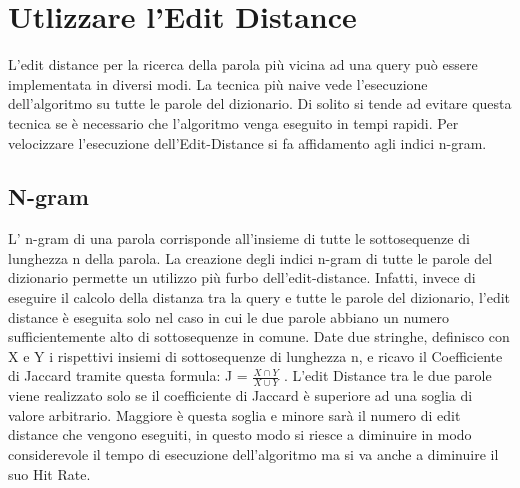 \documentclass{article}
\begin{document}
\section{Utlizzare l'Edit Distance}
L'edit distance per la ricerca della parola più vicina ad una query può essere implementata in diversi modi. La tecnica più naive vede l'esecuzione dell'algoritmo su tutte le parole del dizionario. Di solito si tende ad evitare questa tecnica se è necessario che l'algoritmo venga eseguito in tempi rapidi. Per velocizzare l'esecuzione dell'Edit-Distance si fa affidamento agli indici n-gram.
\subsection{N-gram}
L' n-gram di una parola corrisponde all'insieme di tutte le sottosequenze di lunghezza n della parola.
La creazione degli indici n-gram di tutte le parole del dizionario permette un utilizzo più furbo dell'edit-distance. Infatti, invece di eseguire il calcolo della distanza tra la query e tutte le parole del dizionario, l'edit distance è eseguita solo nel caso in cui le due parole abbiano un numero sufficientemente alto di sottosequenze in comune. Date due stringhe, definisco con X e Y i rispettivi insiemi di sottosequenze di lunghezza n, e ricavo il Coefficiente di Jaccard tramite questa formula: J = $\frac{X\cap Y}{X \cup Y}$ . L'edit Distance tra le due parole viene realizzato solo se il coefficiente di Jaccard è superiore ad una soglia di valore arbitrario. Maggiore è questa soglia e minore sarà il numero di edit distance che vengono eseguiti, in questo modo si riesce a diminuire in modo considerevole il tempo di esecuzione dell'algoritmo ma si va anche a diminuire il suo Hit Rate. 
\end{document}
